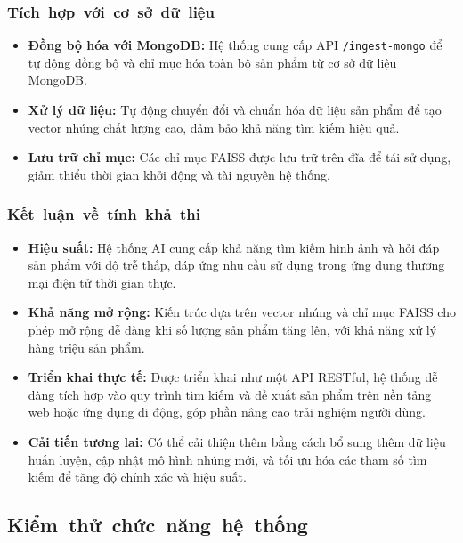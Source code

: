 \subsubsection{\mbox{Tích hợp với cơ sở dữ liệu}}
\begin{itemize}
    \item \textbf{Đồng bộ hóa với MongoDB:} Hệ thống cung cấp API \texttt{/ingest-mongo} để tự động đồng bộ và chỉ mục hóa toàn bộ sản phẩm từ cơ sở dữ liệu MongoDB.
    
    \item \textbf{Xử lý dữ liệu:} Tự động chuyển đổi và chuẩn hóa dữ liệu sản phẩm để tạo vector nhúng chất lượng cao, đảm bảo khả năng tìm kiếm hiệu quả.
    
    \item \textbf{Lưu trữ chỉ mục:} Các chỉ mục FAISS được lưu trữ trên đĩa để tái sử dụng, giảm thiểu thời gian khởi động và tài nguyên hệ thống.
\end{itemize}

\subsubsection{\mbox{Kết luận về tính khả thi}}
\begin{itemize}
    \item \textbf{Hiệu suất:} Hệ thống AI cung cấp khả năng tìm kiếm hình ảnh và hỏi đáp sản phẩm với độ trễ thấp, đáp ứng nhu cầu sử dụng trong ứng dụng thương mại điện tử thời gian thực.
    
    \item \textbf{Khả năng mở rộng:} Kiến trúc dựa trên vector nhúng và chỉ mục FAISS cho phép mở rộng dễ dàng khi số lượng sản phẩm tăng lên, với khả năng xử lý hàng triệu sản phẩm.
    
    \item \textbf{Triển khai thực tế:} Được triển khai như một API RESTful, hệ thống dễ dàng tích hợp vào quy trình tìm kiếm và đề xuất sản phẩm trên nền tảng web hoặc ứng dụng di động, góp phần nâng cao trải nghiệm người dùng.
    
    \item \textbf{Cải tiến tương lai:} Có thể cải thiện thêm bằng cách bổ sung thêm dữ liệu huấn luyện, cập nhật mô hình nhúng mới, và tối ưu hóa các tham số tìm kiếm để tăng độ chính xác và hiệu suất.
\end{itemize}

\subsection{\mbox{Kiểm thử chức năng hệ thống}}

